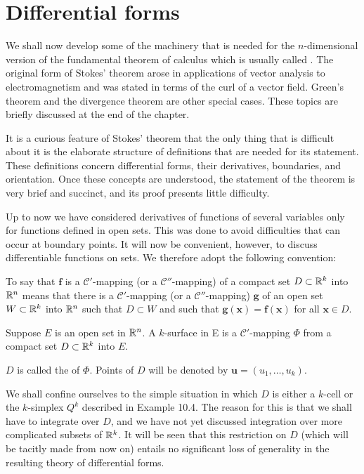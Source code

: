 \section{Differential forms}

We shall now develop some of the machinery that is needed for the $n$-dimensional version of the fundamental theorem of calculus which is usually called .
The original form of Stokes' theorem arose in applications of
vector analysis to electromagnetism and was stated in terms of the curl of a
vector field.
Green's theorem and the divergence theorem are other special cases.
These topics are briefly discussed at the end of the chapter.

It is a curious feature of Stokes' theorem that the only thing that is difficult
about it is the elaborate structure of definitions that are needed for its statement.
These definitions concern differential forms, their derivatives, boundaries, and
orientation. Once these concepts are understood, the statement of the theorem
is very brief and succinct, and its proof presents little difficulty.

Up to now we have considered derivatives of functions of several variables
only for functions defined in open sets. This was done to avoid difficulties that
can occur at boundary points. It will now be convenient, however, to discuss
differentiable functions on  sets. We therefore adopt the following
convention:

To say that $\mathbf{f}$ is a $\mathscr{C}'$-mapping (or a $\mathscr{C}''$-mapping) of a compact set
$D \subset {\protect\mathbb R}^k$ into ${\protect\mathbb R}^n$ means that there is a $\mathscr{C}'$-mapping (or a $\mathscr{C}''$-mapping) $\mathbf{g}$ of
an open set $W \subset {\protect\mathbb R}^k$ into ${\protect\mathbb R}^n$ such that $D \subset W$ and such that $\mathbf{g(x) = f(x)}$ for all $\mathbf{x} \in D$.

\begin{mydef}
    \label{mydef:10.10}
    Suppose $E$ is an open set in ${\protect\mathbb R}^n$.
    A $k$-surface in E is a $\mathscr{C}'$-mapping $\Phi$ from a compact set $D \subset {\protect\mathbb R}^k$ into $E$.

    $D$ is called the  of $\Phi$.
    Points of $D$ will be denoted by $\mathbf{u} = (u_1, \dots , u_k)$.
\end{mydef}

We shall confine ourselves to the simple situation in which $D$ is either a $k$-cell or the $k$-simplex $Q^k$ described in Example 10.4. The reason for this is that we shall have to integrate over $D$,
and we have not yet discussed integration over more complicated subsets of ${\protect\mathbb R}^k$.
It will be seen that this restriction on $D$
(which will be tacitly made from now on) entails no significant loss of generality in the resulting theory of differential forms.

